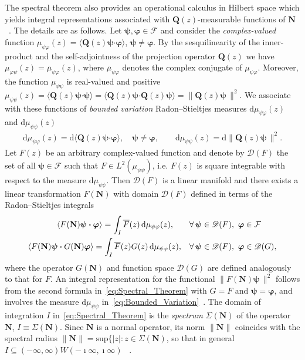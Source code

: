 \documentclass[leqno,onefignum,onetabnum]{siamltex1213}
\renewcommand{\d}{\mathrm{d}}
\newcommand{\Qb}{\mathbf{Q}}
\newcommand{\Nb}{\mathbf{N}}
\newcommand{\Fc}{\mathcal{F}}
\providecommand\bcdot{\boldsymbol{\cdot}}
\newcommand{\vecpsi}{\boldsymbol{\psi}}
\newcommand{\vecvarphi}{\boldsymbol{\varphi}}
\begin{document}
The spectral theorem also provides an operational calculus in Hilbert
space which yields integral representations associated with
$\Qb(z)$-measurable functions of $\Nb$~\cite{Stone:64}. The details
are as follows. Let $\vecpsi,\vecvarphi\in\Fc$ and consider the
\emph{complex-valued} function $\mu_{\psi\varphi}(z)=\langle\Qb(z)\vecpsi\bcdot\vecvarphi\rangle$,
$\vecpsi\neq\vecvarphi$. By the sesquilinearity of the inner-product and the
self-adjointness of the projection operator $\Qb(z)$ we have
$\mu_{\varphi\psi}(z)=\overline{\mu}_{\psi\varphi}(z)$, where $\overline{\mu}_{\psi\varphi}$ denotes
the complex conjugate of $\mu_{\psi\varphi}$. Moreover, the function $\mu_{\psi\psi}$ is
real-valued and positive
$\mu_{\psi\psi}(z)=\langle\Qb(z)\vecpsi\bcdot\vecpsi\rangle=\langle\Qb(z)\vecpsi\bcdot\Qb(z)\vecpsi\rangle
=\|\Qb(z)\vecpsi\,\|^2$. We associate with these functions of
\emph{bounded variation} Radon--Stieltjes measures $\d\mu_{\psi\varphi}(z)$ and
$\d\mu_{\psi\psi}(z)$~\cite{Stone:64}   
%
\begin{align}%
  \d\mu_{\psi\varphi}(z)=\d\langle\Qb(z)\vecpsi\bcdot\vecvarphi\rangle, \quad
  \vecpsi\neq\vecvarphi, \qquad
  \d\mu_{\psi\psi}(z)=\d\|\Qb(z)\vecpsi\,\|^2.
\end{align} 
%
Let $F(z)$ be an arbitrary complex-valued function and denote by
$\mathscr{D}(F)$ the set of all $\vecpsi\in\Fc$ such that
$F\in L^2(\mu_{\psi\psi})$, i.e. $F(z)$ is square integrable with respect to the
measure $\d\mu_{\psi\psi}$. 
Then $\mathscr{D}(F)$ is a linear manifold and there exists a linear
transformation $F(\Nb)$ with domain $\mathscr{D}(F)$ defined in terms
of the Radon--Stieltjes integrals~\cite{Stone:64} 
%
\begin{align}%
  \langle F(\Nb)\vecpsi\bcdot\vecvarphi\rangle=\int_I\overline{F}(z)\,\d\mu_{\psi\varphi}(z), \qquad
  &\forall \, \vecpsi\in\mathscr{D}(F), \ \vecvarphi\in\Fc
  \\
  \langle F(\Nb)\vecpsi\bcdot G(\Nb)\vecvarphi\rangle=\int_I\overline{F}(z)G(z)\,\d\mu_{\psi\varphi}(z),
  \quad
  &\forall \, \vecpsi\in\mathscr{D}(F), \ \vecvarphi\in\mathscr{D}(G),
  \notag
\end{align}
%
where the operator $G(\Nb)$ and function space $\mathscr{D}(G)$ are
defined analogously to that for $F$. An integral representation for
the functional $\|F(\Nb)\vecpsi\,\|^2$ follows from the second formula
in~\eqref{eq:Spectral_Theorem} with $G=F$ and $\vecpsi=\vecvarphi$, and
involves the measure $\d\mu_{\psi\psi}$
in~\eqref{eq:Bounded_Variation}~\cite{Stone:64}.  The domain of
integration $I$ 
in~\eqref{eq:Spectral_Theorem} is the \emph{spectrum} $\Sigma(\Nb)$ of the 
operator $\Nb$, $I\equiv\Sigma(\Nb)$. Since $\Nb$ is a normal operator, its norm 
$\|\Nb\|$ coincides with the spectral radius
$\|\Nb\|=\text{sup}\{|z|: z\in\Sigma(\Nb)$, so that in general
$I\subseteq(-\infty,\infty)W(-\imath\infty,\imath\infty)$ ~\cite{Reed-1980,Stone:64}.  
\end{document}
